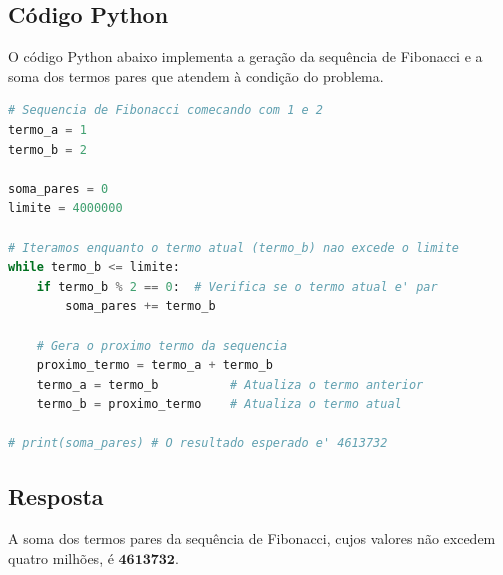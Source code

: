 \subsection*{Código Python}
O código Python abaixo implementa a geração da sequência de Fibonacci e a soma dos termos pares que atendem à condição do problema.
\begin{lstlisting}[caption=Solução do Problema 2 em Python, language=Python]
# Sequencia de Fibonacci comecando com 1 e 2
termo_a = 1
termo_b = 2

soma_pares = 0
limite = 4000000

# Iteramos enquanto o termo atual (termo_b) nao excede o limite
while termo_b <= limite:
    if termo_b % 2 == 0:  # Verifica se o termo atual e' par
        soma_pares += termo_b
    
    # Gera o proximo termo da sequencia
    proximo_termo = termo_a + termo_b
    termo_a = termo_b          # Atualiza o termo anterior
    termo_b = proximo_termo    # Atualiza o termo atual

# print(soma_pares) # O resultado esperado e' 4613732
\end{lstlisting}

\subsection*{Resposta}
A soma dos termos pares da sequência de Fibonacci, cujos valores não excedem quatro milhões, é $\mathbf{4613732}$.

\newpage
